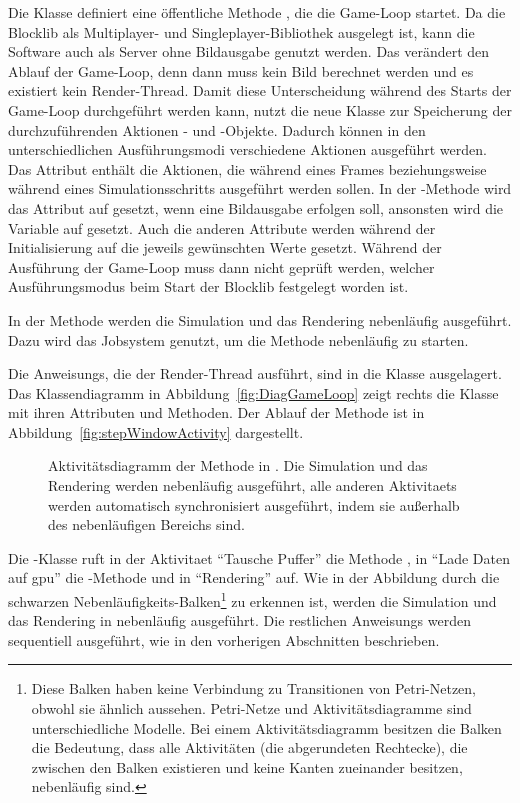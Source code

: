 Die Klasse definiert eine öffentliche Methode , die die Game-Loop startet. Da die Blocklib als Multiplayer- und Singleplayer-Bibliothek ausgelegt ist, kann die Software auch als Server ohne Bildausgabe genutzt werden. Das verändert den Ablauf der Game-Loop, denn dann muss kein Bild berechnet werden und es existiert kein Render-Thread. Damit diese Unterscheidung während des Starts der Game-Loop durchgeführt werden kann, nutzt die neue Klasse \classGameLoop{} zur Speicherung der durchzuführenden Aktionen \classRunnable{}- und \classSupplier{}-Objekte. Dadurch können in den unterschiedlichen Ausführungsmodi verschiedene Aktionen ausgeführt werden. Das Attribut  enthält die Aktionen, die während eines Frames beziehungsweise während eines Simulationsschritts ausgeführt werden sollen. In der -Methode wird das Attribut auf  gesetzt, wenn eine Bildausgabe erfolgen soll, ansonsten wird die Variable auf  gesetzt. Auch die anderen Attribute werden während der Initialisierung auf die jeweils gewünschten Werte gesetzt. Während der Ausführung der Game-Loop muss dann nicht geprüft werden, welcher Ausführungsmodus beim Start der Blocklib festgelegt worden ist.

In der Methode  werden die Simulation und das Rendering nebenläufig ausgeführt. Dazu wird das Jobsystem genutzt, um die Methode  nebenläufig zu starten. 

Die \glspl{Anweisung}, die der Render-Thread ausführt, sind in die Klasse \classRenderThread{} ausgelagert. Das Klassendiagramm in Abbildung~\vref{fig:DiagGameLoop} zeigt rechts die Klasse \classRenderThread{} mit ihren Attributen und Methoden. Der Ablauf der Methode  ist in Abbildung~\vref{fig:stepWindowActivity} dargestellt.
\begin{figure}
	\centering
	
	\caption[Aktivitätsdiagramm der Methode  in \classGameLoop{}.]{Aktivitätsdiagramm der Methode  in \classGameLoop{}. Die Simulation und das Rendering werden nebenläufig ausgeführt, alle anderen \glspl{Aktivitaet} werden automatisch synchronisiert ausgeführt, indem sie außerhalb des nebenläufigen Bereichs sind.}\label{fig:stepWindowActivity}
\end{figure}
Die \classGameLoop{}-Klasse ruft in der \gls{Aktivitaet} \enquote{Tausche Puffer} die Methode , in \enquote{Lade Daten auf \ac{gpu}} die -Methode und in \enquote{Rendering}  auf. Wie in der Abbildung durch die schwarzen Nebenläufigkeits-Balken\footnote{Diese Balken haben keine Verbindung zu Transitionen von Petri-Netzen, obwohl sie ähnlich aussehen. Petri-Netze und Aktivitätsdiagramme sind unterschiedliche Modelle. Bei einem Aktivitätsdiagramm besitzen die Balken die Bedeutung, dass alle Aktivitäten (die abgerundeten Rechtecke), die zwischen den Balken existieren und keine Kanten zueinander besitzen, nebenläufig sind.} zu erkennen ist, werden die Simulation und das Rendering in  nebenläufig ausgeführt. Die restlichen \glspl{Anweisung} werden sequentiell ausgeführt, wie in den vorherigen Abschnitten beschrieben.